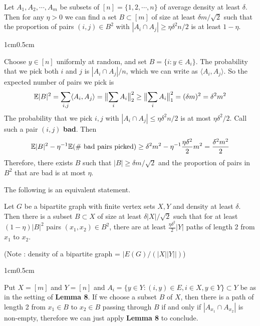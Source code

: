 \documentclass[12pt,a4paper]{report}
\newenvironment{proof}
{\begin{changemargin}{1cm}{0.5cm}
	}%
	{\end{changemargin}
}
\begin{document}
 Let $A_1, A_2,\cdots, A_m$ be subsets of $[n]=\{1,2,\cdots,n\}$ of average density at least $\delta$. Then for any $\eta >0$ we can find a set $B \subset [m]$ of size at least $\delta m/\sqrt{2}$ such that the proportion of pairs $(i,j) \in B^2$ with $|A_i \cap A_j| \geq \eta \delta^2 n/2$ is at least $1-\eta$.
\begin{proof}
\pf Choose $y\in [n]$ uniformly at random, and set $B = \{i: y\in A_i \}$. The probability that we pick both $i$ and $j$ is $|A_i \cap A_j|/n$, which we can write as $\langle A_i, A_j \rangle$. So the expected number of pairs we pick is 
\begin{align*}
\mathbb{E}|B|^2 = \sum_{i,j} \langle A_i, A_j \rangle = \bigl\lVert\sum_i A_i\bigr\rVert_{2}^2 \geq \bigl\lVert\sum_i A_i\bigr\rVert_{1}^2 =(\delta m)^2 = \delta^2 m^2
\end{align*}
The probability that we pick $i,j$ with $|A_i \cap A_j| \leq \eta \delta^2 n/2$ is at most $\eta \delta^2 /2$. Call such a pair $(i,j)$ \textbf{bad}. Then
\begin{align*}
\mathbb{E} |B|^2 - \eta^{-1} \mathbb{E}(\# \text{ bad pairs picked}) \geq \delta^2 m^2 - \eta^{-1} \frac{\eta \delta^2}{2} m^2 = \frac{\delta^2 m^2}{2}
\end{align*}
Therefore, there exists $B$ such that $|B|\geq \delta m/\sqrt{2}$ and the proportion of pairs in $B^2$ that are bad is at most $\eta$.

\eop
\end{proof}
\s

The following is an equivalent statement.
\s

 Let $G$ be a bipartite graph with finite vertex sets $X,Y$ and density at least $\delta$. Then there is a subset $B\subset X$ of size at least $\delta |X| /\sqrt{2}$ such that for at least $(1-\eta)|B|^2$ pairs $(x_1,x_2)\in B^2$, there are at least $\frac{\eta \delta^2}{2} |Y|$ paths of length 2 from $x_1$ to $x_2$. 

(Note : density of a bipartite graph = $|E(G)/(|X||Y||)$)
\begin{proof}
\pf Put $X =[m]$ and $Y= [n]$ and $A_i = \{y\in Y : (i,y) \in E, i\in X, y\in Y \} \subset Y $ be as in the setting of \textbf{Lemma 8}. If we choose a subset $B$ of $X$, then there is a path of length 2 from $x_1 \in B$ to $x_2 \in B$ passing through $B$ if and only if $|A_{x_1}\cap A_{x_2}|$ is non-empty, therefore we can just apply \textbf{Lemma 8} to conclude.

\eop
\end{proof}
\end{document}
